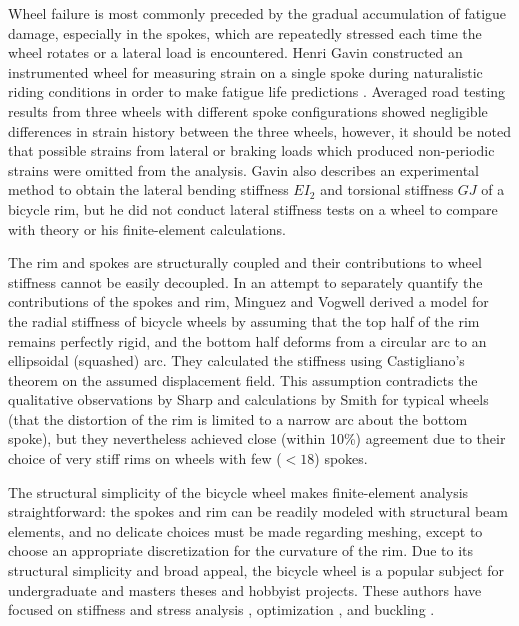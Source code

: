 \documentclass[../thesis.tex]{subfiles}
\begin{document}
Wheel failure is most commonly preceded by the gradual accumulation of fatigue damage, especially in the spokes, which are repeatedly stressed each time the wheel rotates or a lateral load is encountered. Henri Gavin constructed an instrumented wheel for measuring strain on a single spoke during naturalistic riding conditions in order to make fatigue life predictions \cite{Gavin1996}. Averaged road testing results from three wheels with different spoke configurations showed negligible differences in strain history between the three wheels, however, it should be noted that possible strains from lateral or braking loads which produced non-periodic strains were omitted from the analysis. Gavin also describes an experimental method to obtain the lateral bending stiffness $EI_2$ and torsional stiffness $GJ$ of a bicycle rim, but he did not conduct lateral stiffness tests on a wheel to compare with theory or his finite-element calculations.

The rim and spokes are structurally coupled and their contributions to wheel stiffness cannot be easily decoupled. In an attempt to separately quantify the contributions of the spokes and rim, Minguez and Vogwell \cite{Minguez2008} derived a model for the radial stiffness of bicycle wheels by assuming that the top half of the rim remains perfectly rigid, and the bottom half deforms from a circular arc to an ellipsoidal (squashed) arc. They calculated the stiffness using Castigliano's theorem on the assumed displacement field. This assumption contradicts the qualitative observations by Sharp and calculations by Smith for typical wheels (that the distortion of the rim is limited to a narrow arc about the bottom spoke), but they nevertheless achieved close (within 10\%) agreement due to their choice of very stiff rims on wheels with few ($<18$) spokes.

The structural simplicity of the bicycle wheel makes finite-element analysis straightforward: the spokes and rim can be readily modeled with structural beam elements, and no delicate choices must be made regarding meshing, except to choose an appropriate discretization for the curvature of the rim. Due to its structural simplicity and broad appeal, the bicycle wheel is a popular subject for undergraduate and masters theses and  hobbyist projects. These authors have focused on stiffness and stress analysis \cite{Hartz2002,Ng2012}, optimization \cite{Keller2013,Svensson2015}, and buckling \cite{Kern2016}.
\end{document}
